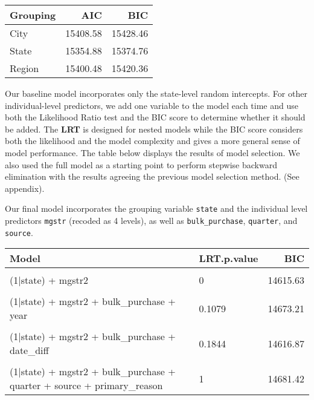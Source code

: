 \documentclass[
  11pt,
]{article}
\begin{document}
\begin{tabular}{l|r|r}
\hline
Grouping & AIC & BIC\\
\hline
City & 15408.58 & 15428.46\\
\hline
State & 15354.88 & 15374.76\\
\hline
Region & 15400.48 & 15420.36\\
\hline
\end{tabular}

Our baseline model incorporates only the state-level random intercepts.
For other individual-level predictors, we add one variable to the model
each time and use both the Likelihood Ratio test and the BIC score to
determine whether it should be added. The \textbf{LRT} is designed for
nested models while the BIC score considers both the likelihood and the
model complexity and gives a more general sense of model performance.
The table below displays the results of model selection. We also used
the full model as a starting point to perform stepwise backward
elimination with the results agreeing the previous model selection
method. (See appendix).

Our final model incorporates the grouping variable \texttt{state} and
the individual level predictors \texttt{mgstr} (recoded as 4 levels), as
well as \texttt{bulk\_purchase}, \texttt{quarter}, and \texttt{source}.

\begin{table}[!h]
\centering
\begin{tabular}{l|l|r}
\hline
Model & LRT.p.value & BIC\\
\hline
\cellcolor{gray!6}{(1|state)} & \cellcolor{gray!6}{} & \cellcolor{gray!6}{15374.76}\\
\hline
(1|state) + mgstr2 & 0 & 14615.63\\
\hline
\cellcolor{gray!6}{(1|state) + mgstr2 + bulk\_purchase} & \cellcolor{gray!6}{2e-04} & \cellcolor{gray!6}{14610.01}\\
\hline
(1|state) + mgstr2 + bulk\_purchase + year & 0.1079 & 14673.21\\
\hline
\cellcolor{gray!6}{(1|state) + mgstr2 + bulk\_purchase + quarter} & \cellcolor{gray!6}{0.0213} & \cellcolor{gray!6}{14626.19}\\
\hline
(1|state) + mgstr2 + bulk\_purchase + date\_diff & 0.1844 & 14616.87\\
\hline
\cellcolor{gray!6}{(1|state) + mgstr2 + bulk\_purchase + quarter + source} & \cellcolor{gray!6}{7e-04} & \cellcolor{gray!6}{14641.45}\\
\hline
(1|state) + mgstr2 + bulk\_purchase + quarter + source + primary\_reason & 1 & 14681.42\\
\hline
\end{tabular}
\end{table}
\end{document}
